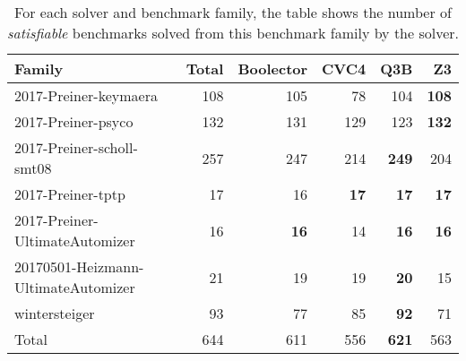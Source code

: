 \begin{table}[tbp]
\centering
\begin{tabular}{lrrrrr}
  \toprule
Family & Total & Boolector & CVC4 & Q3B & Z3 \\ 
  \midrule
2017-Preiner-keymaera & 108 & 105 & 78 & 104 & \textbf{108} \\ 
  2017-Preiner-psyco & 132 & 131 & 129 & 123 & \textbf{132} \\ 
  2017-Preiner-scholl-smt08 & 257 & 247 & 214 & \textbf{249} & 204 \\ 
  2017-Preiner-tptp &  17 & 16 & \textbf{17} & \textbf{17} & \textbf{17} \\ 
  2017-Preiner-UltimateAutomizer &  16 & \textbf{16} & 14 & \textbf{16} & \textbf{16} \\ 
  20170501-Heizmann-UltimateAutomizer &  21 & 19 & 19 & \textbf{20} & 15 \\ 
  wintersteiger &  93 & 77 & 85 & \textbf{92} & 71 \\ 
   \midrule
Total & 644 & 611 & 556 & \textbf{621} & 563 \\ 
   \bottomrule
\end{tabular}
\caption{For each solver and benchmark family, the table shows the number of \emph{satisfiable} benchmarks solved from this benchmark family by the solver.} 
\label{tbl:satSolved}
\end{table}
